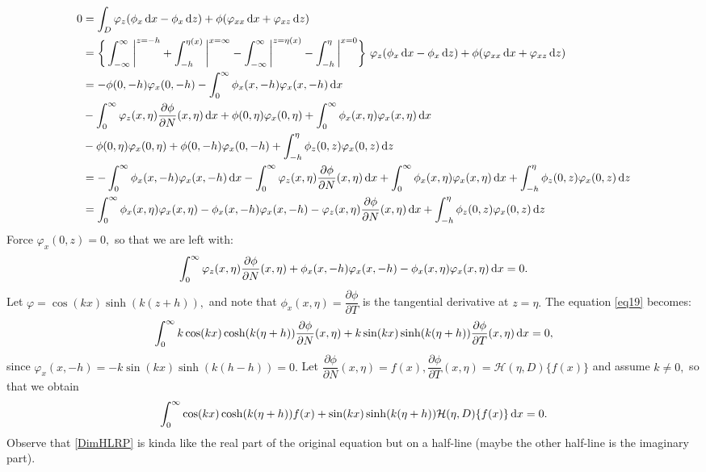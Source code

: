 \documentclass[10pt,reqno,oneside,a4paper]{article}
\begin{document}
\begin{align*}
0 &= \int_D \varphi_z(\phi_x \,\mathrm{d} x - \phi_x \,\mathrm{d} z) + \phi(\varphi_{xx} \,\mathrm{d} x + \varphi_{xz} \,\mathrm{d} z) \\
&= \bigg\{ \int_{-\infty}^{\infty} \bigg|^{z=-h} + \int^{\eta(x)}_{-h} \bigg|^{x = \infty} - \int^{\infty}_{-\infty} \bigg|^{z= \eta(x)} - \int^{\eta}_{-h} \bigg|^{x=0} \bigg\} ~ \varphi_z(\phi_x \,\mathrm{d} x - \phi_x \,\mathrm{d} z) + \phi(\varphi_{xx} \,\mathrm{d} x + \varphi_{xz} \,\mathrm{d} z) \\
&= - \phi(0,-h) \varphi_{x}(0,-h) - \int^{\infty}_{0} \phi_x(x,-h) \varphi_x(x,-h) \,\mathrm{d} x \\
&- \int_{0}^{\infty} \varphi_z(x, \eta)\frac{\partial \phi}{\partial N}(x, \eta)\,\mathrm{d} x + \phi(0, \eta) \varphi_x(0, \eta) + \int^{\infty}_{0}\phi_x(x, \eta)  \varphi_x(x, \eta) \,\mathrm{d} x \\
&-\phi(0, \eta) \varphi_x(0, \eta) + \phi(0, -h) \varphi_x(0, -h) + \int_{-h}^{\eta} \phi_{z}(0,z) \varphi_{x}(0,z) \,\mathrm{d} z \\
&=- \int^{\infty}_{0} \phi_x(x,-h) \varphi_x(x,-h) \,\mathrm{d} x- \int_{0}^{\infty} \varphi_z(x, \eta)\frac{\partial \phi}{\partial N}(x, \eta)\,\mathrm{d} x + \int^{\infty}_{0}\phi_x(x, \eta)  \varphi_x(x, \eta) \,\mathrm{d} x + \int_{-h}^{\eta} \phi_{z}(0,z) \varphi_{x}(0,z) \,\mathrm{d} z\\
&=\int^{\infty}_{0}\phi_x(x, \eta)  \varphi_x(x, \eta) -\phi_x(x,-h) \varphi_x(x,-h) - \varphi_z(x, \eta)\frac{\partial \phi}{\partial N}(x, \eta) \,\mathrm{d} x  + \int_{-h}^{\eta} \phi_{z}(0,z) \varphi_{x}(0,z) \,\mathrm{d} z
\end{align*}
Force $\varphi_x(0,z) = 0,$ so that we are left with:
\begin{equation}\label{eq19}
\int_{0}^{\infty} \varphi_z(x, \eta)\frac{\partial \phi}{\partial N}(x, \eta) + \phi_x(x,-h) \varphi_x(x,-h) - \phi_x(x, \eta) \varphi_x(x, \eta) \,\mathrm{d} x = 0.
\end{equation}
Let $\varphi = \cos(kx) \sinh(k(z+h)),$ and note that $\phi_x(x, \eta) = \dfrac{\partial \phi}{\partial T}$ is the tangential derivative at $z = \eta.$ The equation \eqref{eq19} becomes:
\begin{equation}
\int_{0}^{\infty} k \cos(kx) \cosh(k(\eta+h)) \frac{\partial \phi}{\partial N}(x, \eta) + k \sin(kx) \sinh(k(\eta+h)) \dfrac{\partial \phi}{\partial T}(x, \eta) \,\mathrm{d} x = 0,
\end{equation}
since $\varphi_x(x,-h) = -k \sin(kx) \sinh(k(h-h)) = 0.$ Let $\dfrac{\partial \phi}{\partial N}(x, \eta) = f(x), \dfrac{\partial \phi}{\partial T}(x, \eta) = \mathcal{H}(\eta,D)\{ f(x) \}$ and assume $k \neq 0,$ so that we obtain
\begin{equation}\label{DimHLRP}
\int_{0}^{\infty} \cos(kx) \cosh(k(\eta+h)) f(x) + \sin(kx) \sinh(k(\eta+h))\mathcal{H}(\eta,D) \{f(x) \} \,\mathrm{d} x = 0.
\end{equation}
Observe that \eqref{DimHLRP} is kinda like the real part of the original equation but on a half-line (maybe the other half-line is the imaginary part).
\end{document}
